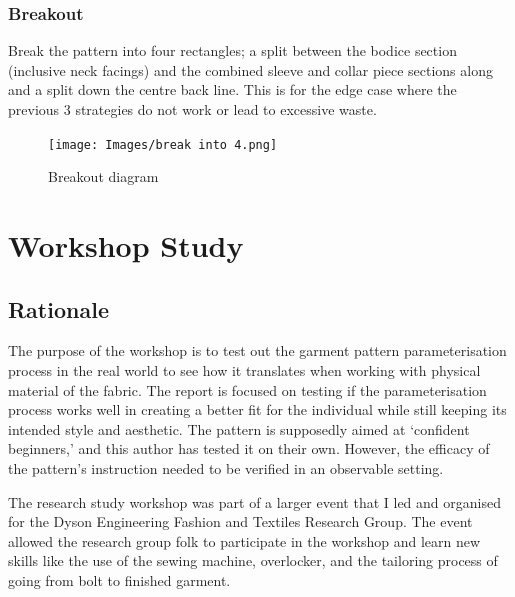 \subsubsection{Breakout}
Break the pattern into four rectangles; a split between the bodice section (inclusive neck facings) and the combined sleeve and collar piece sections along and a split down the centre back line. This is for the edge case where the previous 3 strategies do not work or lead to excessive waste.
\begin{figure} [H] %
    \centering %
    \texttt{[image: Images/break into 4.png]} %
    \caption{Breakout diagram}
\end{figure}



\section{Workshop Study}

\subsection{Rationale}
The purpose of the workshop is to test out the garment pattern parameterisation process in the real world to see how it translates when working with physical material of the fabric. The report is focused on testing if the parameterisation process works well in creating a better fit for the individual while still keeping its intended style and aesthetic. The pattern is supposedly aimed at ‘confident beginners,’ and this author has tested it on their own. However, the efficacy of the pattern’s instruction needed to be verified in an observable setting. 

The research study workshop was part of a larger event that I led and organised for the Dyson Engineering Fashion and Textiles Research Group. The event allowed the research group folk to participate in the workshop and learn new skills like the use of the sewing machine, overlocker, and the tailoring process of going from bolt to finished garment.

